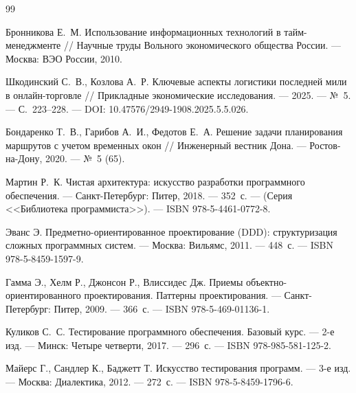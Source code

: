 %

\begin{thebibliography}{99}

      Бронникова Е.~М.
      Использование информационных технологий в тайм-менеджменте //
      Научные труды Вольного экономического общества России. ---
      Москва: ВЭО России, 2010.

      

      Шкодинский С.~В., Козлова А.~Р.
      Ключевые аспекты логистики последней мили в онлайн-торговле //
      Прикладные экономические исследования. ---
      2025. --- №~5. --- С.~223--228. ---
      DOI: 10.47576/2949-1908.2025.5.5.026.

      

      Бондаренко Т.~В., Гарибов А.~И., Федотов Е.~А.
      Решение задачи планирования маршрутов с учетом временных окон //
      Инженерный вестник Дона. --- Ростов-на-Дону, 2020. --- №~5 (65).

      

      Мартин Р.~К.
      Чистая архитектура: искусство разработки программного обеспечения. ---
      Санкт-Петербург: Питер, 2018. --- 352~с. ---
      (Серия <<Библиотека программиста>>). ---
      ISBN 978-5-4461-0772-8.

      

      Эванс Э.
      Предметно-ориентированное проектирование (DDD): структуризация сложных программных систем. ---
      Москва: Вильямс, 2011. --- 448~с. ---
      ISBN 978-5-8459-1597-9.

      

      Гамма Э., Хелм Р., Джонсон Р., Влиссидес Дж.
      Приемы объектно-ориентированного проектирования. Паттерны проектирования. ---
      Санкт-Петербург: Питер, 2009. --- 366~с. ---
      ISBN 978-5-469-01136-1.

      

      Куликов С.~С.
      Тестирование программного обеспечения. Базовый курс. ---
      2-е изд. ---
      Минск: Четыре четверти, 2017. --- 296~с. ---
      ISBN 978-985-581-125-2.

      

      Майерс Г., Сандлер К., Баджетт Т.
      Искусство тестирования программ. ---
      3-е изд. ---
      Москва: Диалектика, 2012. --- 272~с. ---
      ISBN 978-5-8459-1796-6.


\end{thebibliography}
